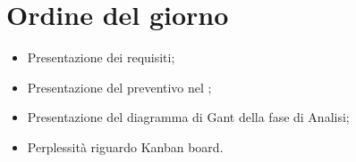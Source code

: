 \section{Ordine del giorno}
\begin{itemize}
\item Presentazione dei requisiti;
\item Presentazione del preventivo nel \PdP;
\item Presentazione del diagramma di Gant della fase di Analisi;
\item Perplessità riguardo Kanban board.
\end{itemize}